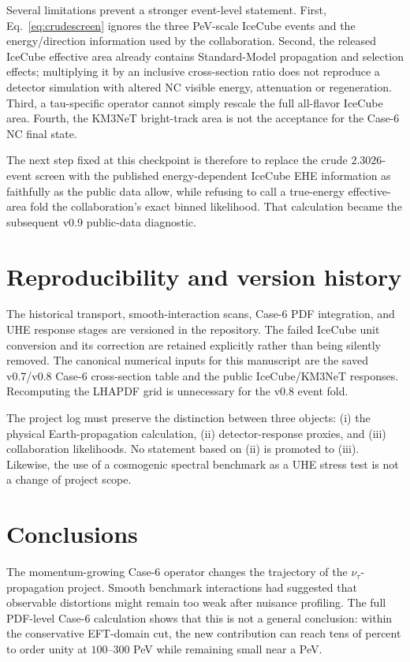 \documentclass[11pt,a4paper]{article}
\begin{document}
Several limitations prevent a stronger event-level statement.  First,
Eq.~\eqref{eq:crudescreen} ignores the three PeV-scale IceCube events and the
energy/direction information used by the collaboration.  Second, the released
IceCube effective area already contains Standard-Model propagation and
selection effects; multiplying it by an inclusive cross-section ratio does
not reproduce a detector simulation with altered NC visible energy,
attenuation or regeneration.  Third, a tau-specific operator cannot simply
rescale the full all-flavor IceCube area.  Fourth, the KM3NeT bright-track area
is not the acceptance for the Case-6 NC final state.

The next step fixed at this checkpoint is therefore to replace the crude
$2.3026$-event screen with the published energy-dependent IceCube EHE
information as faithfully as the public data allow, while refusing to call a
true-energy effective-area fold the collaboration's exact binned likelihood.
That calculation became the subsequent v0.9 public-data diagnostic.

\section{Reproducibility and version history}
The historical transport, smooth-interaction scans, Case-6 PDF integration,
and UHE response stages are versioned in the repository.  The failed IceCube
unit conversion and its correction are retained explicitly rather than being
silently removed.  The canonical numerical inputs for this manuscript are the
saved v0.7/v0.8 Case-6 cross-section table and the public IceCube/KM3NeT
responses.  Recomputing the LHAPDF grid is unnecessary for the v0.8 event fold.

The project log must preserve the distinction between three objects:
(i) the physical Earth-propagation calculation, (ii) detector-response proxies,
and (iii) collaboration likelihoods.  No statement based on (ii) is promoted
to (iii).  Likewise, the use of a cosmogenic spectral benchmark as a UHE
stress test is not a change of project scope.

\section{Conclusions}
The momentum-growing Case-6 operator changes the trajectory of the
$\nu_\tau$-propagation project.  Smooth benchmark interactions had suggested
that observable distortions might remain too weak after nuisance profiling.
The full PDF-level Case-6 calculation shows that this is not a general
conclusion: within the conservative EFT-domain cut, the new contribution can
reach tens of percent to order unity at $100$--$300$ PeV while remaining small
near a PeV.
\end{document}
